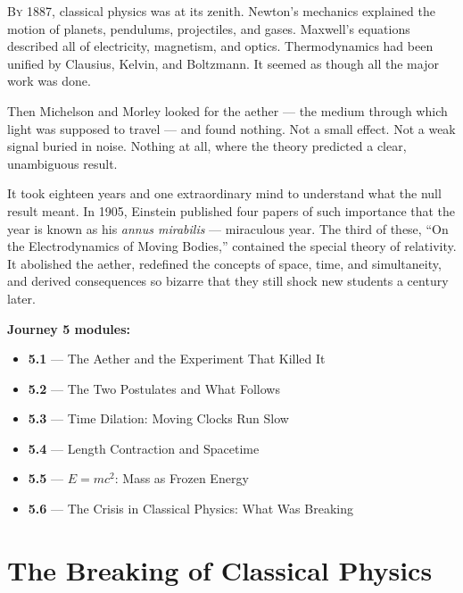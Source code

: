 \documentclass[12pt, a4paper, twoside]{book}
\begin{document}
\lettrine[lines=3,loversize=0.08]{\textcolor{accent}{B}}{y} 1887, classical physics was at its zenith. Newton's mechanics explained the motion of planets, pendulums, projectiles, and gases. Maxwell's equations described all of electricity, magnetism, and optics. Thermodynamics had been unified by Clausius, Kelvin, and Boltzmann. It seemed as though all the major work was done.

Then Michelson and Morley looked for the aether --- the medium through which light was supposed to travel --- and found nothing. Not a small effect. Not a weak signal buried in noise. Nothing at all, where the theory predicted a clear, unambiguous result.

It took eighteen years and one extraordinary mind to understand what the null result meant. In 1905, Einstein published four papers of such importance that the year is known as his \textit{annus mirabilis} --- miraculous year. The third of these, ``On the Electrodynamics of Moving Bodies,'' contained the special theory of relativity. It abolished the aether, redefined the concepts of space, time, and simultaneity, and derived consequences so bizarre that they still shock new students a century later.

\textbf{Journey 5 modules:}
\begin{itemize}[leftmargin=2em,itemsep=2pt]
  \item \textbf{5.1} --- The Aether and the Experiment That Killed It
  \item \textbf{5.2} --- The Two Postulates and What Follows
  \item \textbf{5.3} --- Time Dilation: Moving Clocks Run Slow
  \item \textbf{5.4} --- Length Contraction and Spacetime
  \item \textbf{5.5} --- $E = mc^2$: Mass as Frozen Energy
  \item \textbf{5.6} --- The Crisis in Classical Physics: What Was Breaking
\end{itemize}

\tableofcontents

\chapter{The Breaking of Classical Physics}

\end{document}
